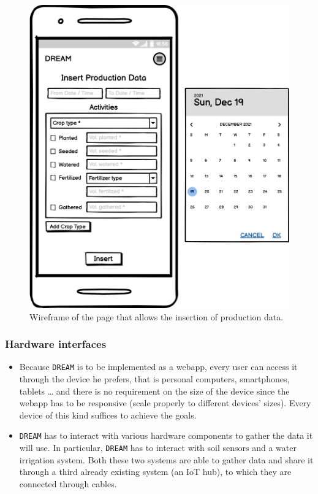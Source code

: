 \documentclass{article}
\begin{document}
\begin{figure}[H]
    \centering
    \includegraphics[scale=0.15]{wireframes/productiondata.png}
    \caption{Wireframe of the page that allows the insertion of production data.}
\end{figure}
\subsubsection{Hardware interfaces}
\begin{itemize}
\item Because \verb|DREAM| is to be implemented as a webapp, every user can access it through the device he prefers, that is personal computers, smartphones, tablets … and there is no requirement on the size of the device since the webapp has to be responsive (scale properly to different devices’ sizes). Every device of this kind suffices to achieve the goals.
\item \verb|DREAM| has to interact with various hardware components to gather the data it will use. In particular, \verb|DREAM| has to interact with soil sensors and a water irrigation system. Both these two systems are able to gather data and share it through a third already existing system (an IoT hub), to which they are connected through cables.
\end{itemize}
\end{document}
